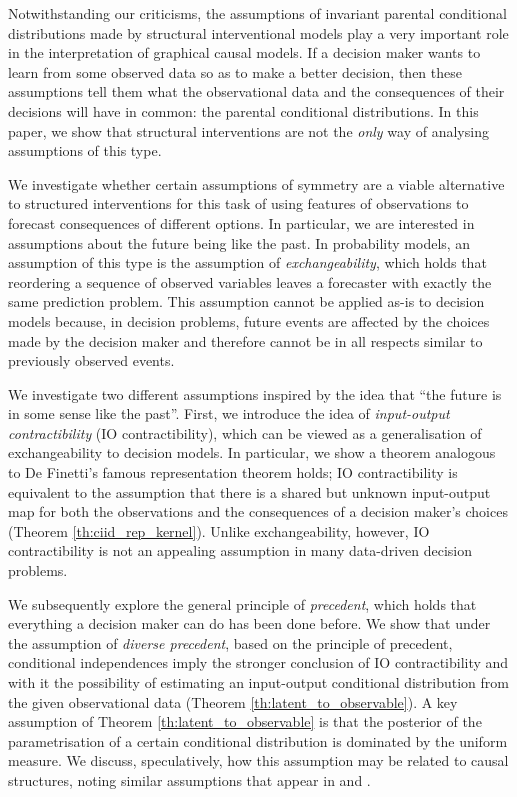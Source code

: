 \documentclass[USenglish,onecolumn]{article}
\begin{document}
Notwithstanding our criticisms, the assumptions of invariant parental conditional distributions made by structural interventional models play a very important role in the interpretation of graphical causal models. If a decision maker wants to learn from some observed data so as to make a better decision, then these assumptions tell them what the observational data and the consequences of their decisions will have in common: the parental conditional distributions. In this paper, we show that structural interventions are not the \emph{only} way of analysing assumptions of this type.

We investigate whether certain assumptions of symmetry are a viable alternative to structured interventions for this task of using features of observations to forecast consequences of different options. In particular, we are interested in assumptions about the future being like the past. In probability models, an assumption of this type is the assumption of \emph{exchangeability}, which holds that reordering a sequence of observed variables leaves a forecaster with exactly the same prediction problem. This assumption cannot be applied as-is to decision models because, in decision problems, future events are affected by the choices made by the decision maker and therefore cannot be in all respects similar to previously observed events.

We investigate two different assumptions inspired by the idea that ``the future is in some sense like the past''. First, we introduce the idea of \emph{input-output contractibility} (IO contractibility), which can be viewed as a generalisation of exchangeability to decision models. In particular, we show a theorem analogous to De Finetti's famous representation \citep{de_finetti_foresight_1992} theorem holds; IO contractibility is equivalent to the assumption that there is a shared but unknown input-output map for both the observations and the consequences of a decision maker's choices (Theorem \ref{th:ciid_rep_kernel}). Unlike exchangeability, however, IO contractibility is not an appealing assumption in many data-driven decision problems.

We subsequently explore the general principle of \emph{precedent}, which holds that everything a decision maker can do has been done before.  We show that under the assumption of \emph{diverse precedent}, based on the principle of precedent, conditional independences imply the stronger conclusion of IO contractibility and with it the possibility of estimating an input-output conditional distribution from the given observational data (Theorem \ref{th:latent_to_observable}). A key assumption of Theorem \ref{th:latent_to_observable} is that the posterior of the parametrisation of a certain conditional distribution is dominated by the uniform measure. We discuss, speculatively, how this assumption may be related to causal structures, noting similar assumptions that appear in \citet{meek_strong_1995} and \citet{janzingCausalVersionsMaximum2021}.
\end{document}
